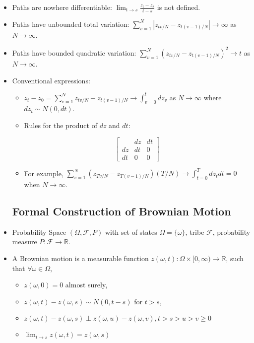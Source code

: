 \documentclass{article}
\newcommand{\R}{\mathbb{R}}
\newcommand{\F}{\mathcal{F}}
\begin{document}
\begin{itemize}
\item Paths are nowhere differentiable: $\lim_{t \to s} \frac{z_t - z_s}{t - s}$ is not defined.

\item Paths have unbounded total variation: $\sum_{v=1}^N |z_{tv/N} - z_{t(v-1)/N}| \to \infty$ as $N\to \infty$.

\item Paths have bounded quadratic variation: $\sum_{v=1}^N (z_{tv/N} - z_{t(v-1)/N})^2 \to t$ as $N\to \infty$. 

\item Conventional expressions:

\begin{itemize}

\item  $z_t - z_0 = \sum_{v=1}^N z_{tv/N} - z_{t(v-1)/N} \to \int_{v=0}^t dz_v$ as $N\to \infty$ where $dz_t \sim N(0, dt)$.

\item Rules for the product of $dz$ and $dt$:

$$
\begin{bmatrix}
   & dz & dt\\
dz & dt & 0\\
dt & 0  & 0
\end{bmatrix}
$$

\item For example, $\sum_{v=1}^N (z_{Tv/N} - z_{T(v-1)/N})(T/N) \to \int_{t=0}^T dz_t dt = 0$ when $N \to \infty$.

\end{itemize}


\subsection*{Formal Construction of Brownian Motion}


\item Probability Space $(\Omega, \F, P)$ with set of states $\Omega = \{ \omega\}$, tribe $\F$, probability measure $P:\F \to \R$.

\item A Brownian motion is a measurable function $z(\omega, t):\Omega \times [0, \infty) \to \R$, such that $\forall \omega \in \Omega$,

\begin{itemize}

\item $z(\omega, 0) = 0$ almost surely,
\item $z(\omega, t) - z(\omega, s) \sim N(0, t - s)$ for $t > s$,
\item $z(\omega, t) - z(\omega, s) \perp z(\omega, u) - z(\omega, v), t >s>u>v\ge 0$
\item $\lim_{t \to s} z(\omega, t) = z(\omega, s)$


\end{itemize}
\end{itemize}
\end{document}
